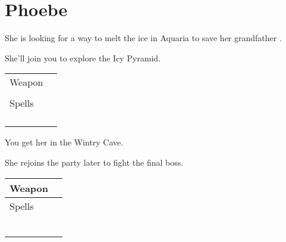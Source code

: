 \section{Phoebe}
\label{char:phoebe}


She is looking for a way to melt the ice in Aquaria to save her grandfather .

She’ll join you to explore the Icy Pyramid.

\bigskip
\begin{tabular}{ l | l }
	Weapon & \nameref{weapon:cat_claw} \\
	& \nameref{weapon:bow_of_grace} \\
	\hline
	Spells & \nameref{spell:cure} \\
	& \nameref{spell:heal} \\
	& \nameref{spell:life} \\
	& \nameref{spell:fire} \\
	& \nameref{spell:thunder}
\end{tabular}
\bigskip

You get her  in the Wintry Cave.

\vspace{1em}

She rejoins the party later to fight the final boss.

\bigskip
\begin{tabular}{ l | l }
	Weapon & \nameref{weapon:bow_of_grace} \\
	\hline
	Spells & \nameref{spell:cure} \\
	& \nameref{spell:heal} \\
	& \nameref{spell:life} \\
	& \nameref{spell:blizzard} \\
	& \nameref{spell:fire} \\
	& \nameref{spell:thunder} \\
	& \nameref{spell:white}
\end{tabular}
\bigskip
